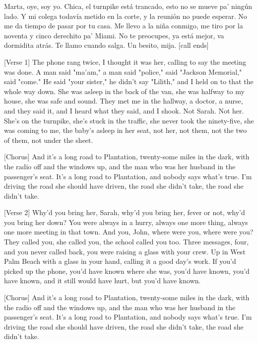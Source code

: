 \begin{lyrics}
Marta, oye, soy yo.
Chica, el turnpike está trancado, esto no se mueve pa' ningún lado.
Y mi colega todavía metido en la corte, y la reunión no puede esperar.
No me da tiempo de pasar por tu casa.
Me llevo a la niña conmigo, me tiro por la noventa y cinco derechito pa' Miami.
No te preocupes, ya está mejor, va dormidita atrás.
Te llamo cuando salga. Un besito, mija.
[call ends]

[Verse 1]
The phone rang twice, I thought it was her,
calling to say the meeting was done.
A man said "ma'am," a man said "police,"
said "Jackson Memorial," said "come."
He said "your sister," he didn't say "Lilith,"
and I held on to that the whole way down.
She was asleep in the back of the van,
she was halfway to my house, she was safe and sound.
They met me in the hallway, a doctor, a nurse,
and they said it, and I heard what they said, and I shook.
Not Sarah. Not her. She's on the turnpike,
she's stuck in the traffic, she never took
the ninety-five, she was coming to me,
the baby's asleep in her seat,
not her, not them, not the two of them,
not under the sheet.

[Chorus]
And it's a long road to Plantation,
twenty-some miles in the dark,
with the radio off and the windows up,
and the man who was her husband in the passenger's seat.
It's a long road to Plantation,
and nobody says what's true.
I'm driving the road she should have driven,
the road she didn't take, the road she didn't take.

[Verse 2]
Why'd you bring her, Sarah, why'd you bring her,
fever or not, why'd you bring her down?
You were always in a hurry, always one more thing,
always one more meeting in that town.
And you, John, where were you, where were you?
They called you, she called you, the school called you too.
Three messages, four, and you never called back,
you were raising a glass with your crew.
Up in West Palm Beach with a glass in your hand,
calling it a good day's work.
If you'd picked up the phone, you'd have known where she was,
you'd have known, you'd have known, and it still would have hurt,
but you'd have known.

[Chorus]
And it's a long road to Plantation,
twenty-some miles in the dark,
with the radio off and the windows up,
and the man who was her husband in the passenger's seat.
It's a long road to Plantation,
and nobody says what's true.
I'm driving the road she should have driven,
the road she didn't take, the road she didn't take.


\end{lyrics}
